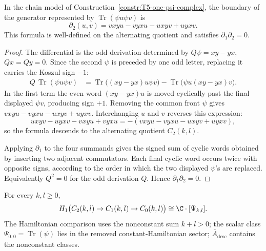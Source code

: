 \begin{lem}\label{lem:T5-two-psi-boundary-sign}
  In the chain model of
  Construction~\ref{constr:T5-one-psi-complex}, the boundary of the
  generator represented by \(\operatorname{Tr}(\psi u\psi v)\) is
  \[
    \partial_2(u,v)=vxyu-vyxu-uxyv+uyxv.
  \]
  This formula is well-defined on the alternating quotient and satisfies
  \(\partial_1\partial_2=0\).
\end{lem}

\begin{proof}
  The differential is the odd derivation determined by
  \(Q\psi=xy-yx\), \(Qx=Qy=0\).  Since the second \(\psi\) is preceded
  by one odd letter, replacing it carries the Koszul sign \(-1\):
  \[
  \begin{aligned}
    Q\,\operatorname{Tr}(\psi u\psi v)
      &=
      \operatorname{Tr}\bigl((xy-yx)u\psi v\bigr)
      -\operatorname{Tr}\bigl(\psi u(xy-yx)v\bigr).
  \end{aligned}
  \]
  In the first term the even word \((xy-yx)u\) is moved cyclically past
  the final displayed \(\psi v\), producing sign \(+1\).  Removing
  the common front \(\psi\) gives
  \(vxyu-vyxu-uxyv+uyxv\).  Interchanging \(u\) and \(v\) reverses this
  expression:
  \[
    uxyv-uyxv-vxyu+vyxu=-(vxyu-vyxu-uxyv+uyxv),
  \]
  so the formula descends to the alternating quotient \(C_2(k,l)\).

  Applying \(\partial_1\) to the four summands gives the signed sum of
  cyclic words obtained by inserting two adjacent commutators.  Each
  final cyclic word occurs twice with opposite signs, according to the
  order in which the two displayed \(\psi\)'s are replaced.  Equivalently
  \(Q^2=0\) for the odd derivation \(Q\).  Hence
  \(\partial_1\partial_2=0\).
\end{proof}

\begin{thm}\label{thm:T5-one-psi-homology}
  For every \(k,l\ge0\),
  \[
    H_1\bigl(C_2(k,l)\to C_1(k,l)\to C_0(k,l)\bigr)
      \cong \C\cdot[\Psi_{k,l}].
  \]
  The Hamiltonian comparison uses the nonconstant sum \(k+l>0\); the
  scalar class \(\Psi_{0,0}=\operatorname{Tr}(\psi)\) lies in the
  removed constant-Hamiltonian sector; \(\bar A_{\mathrm{desc}}\)
  contains the nonconstant classes.
\end{thm}


